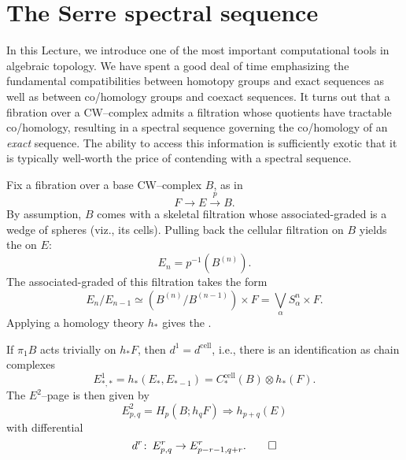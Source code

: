 \section{The Serre spectral sequence}

In this Lecture, we introduce one of the most important computational tools in algebraic topology.
We have spent a good deal of time emphasizing the fundamental compatibilities between homotopy groups and exact sequences as well as between co/homology groups and coexact sequences.
It turns out that a fibration over a CW--complex admits a filtration whose quotients have tractable co/homology, resulting in a spectral sequence governing the co/homology of an \emph{exact} sequence.
The ability to access this information is sufficiently exotic that it is typically well-worth the price of contending with a spectral sequence.

\begin{definition}
Fix a fibration over a base CW--complex $B$, as in \[F \to E \xrightarrow p B.\]
By assumption, $B$ comes with a skeletal filtration whose associated-graded is a wedge of spheres (viz., its cells).
Pulling back the cellular filtration on $B$ yields the  on $E$: \[E_n = p^{-1}(B^{(n)}).\]
The associated-graded of this filtration takes the form \[E_n / E_{n-1} \simeq (B^{(n)} / B^{(n-1)}) \times F = \bigvee_\alpha S^n_\alpha \times F.\]
Applying a homology theory $h_*$ gives the .
\end{definition}

\begin{theorem}[Serre]
If $\pi_1 B$ acts trivially on $h_* F$, then $d^1 = d^{\mathrm{cell}}$, i.e., there is an identification as chain complexes \[E^1_{*, *} = h_*(E_*, E_{*-1}) = C^{\mathrm{cell}}_*(B) \otimes h_*(F).\]
The $E^2$--page is then given by \[E^2_{p, q} = H_p(B; h_q F) \Rightarrow h_{p+q}(E)\] with differential \[d^r\colon\thinspace E^r_{p, q} \to E^r_{p-r-1, q+r}. \qed\]
\end{theorem}

